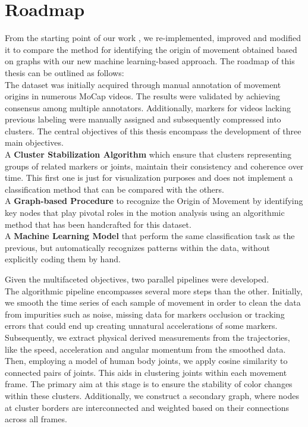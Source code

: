 \section{Roadmap}
From the starting point of our work \cite{kolykhalova:2020}, we re-implemented, improved and modified it to compare the method for identifying the origin of movement obtained based on graphs with our new machine learning-based approach.
The roadmap of this thesis can be outlined as follows: \\
The dataset was initially acquired through manual annotation of movement origins in numerous MoCap videos. 
The results were validated by achieving consensus among multiple annotators. 
Additionally, markers for videos lacking previous labeling were manually assigned and subsequently compressed into clusters.
The central objectives of this thesis encompass the development of three main objectives.\\
A \textbf{Cluster Stabilization Algorithm} which ensure that clusters representing groups of related markers or joints, maintain their consistency and coherence over time.
This first one is just for visualization purposes and does not implement a classification method that can be compared with the others.\\
A \textbf{Graph-based Procedure} to recognize the Origin of Movement by identifying key nodes that play pivotal roles in the motion analysis using an algorithmic method that has been handcrafted for this dataset.\\
A \textbf{Machine Learning Model} that perform the same classification task as the previous, but automatically recognizes patterns within the data, without explicitly coding them by hand.

Given the multifaceted objectives, two parallel pipelines were developed.\\
The algorithmic pipeline encompasses several more steps than the other. 
Initially, we smooth the time series of each sample of movement in order to clean the data from impurities such as noise, missing data for markers occlusion or tracking errors that could end up creating unnatural accelerations of some markers. 
Subsequently, we extract physical derived measurements from the trajectories, like the speed, acceleration and angular momentum from the smoothed data. 
Then, employing a model of human body joints, we apply cosine similarity to connected pairs of joints. 
This aids in clustering joints within each movement frame. 
The primary aim at this stage is to ensure the stability of color changes within these clusters. 
Additionally, we construct a secondary graph, where nodes at cluster borders are interconnected and weighted based on their connections across all frames.

